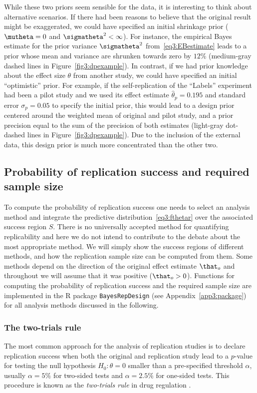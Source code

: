 While these two priors seem sensible for the \citet{Protzko2020} data, it is
interesting to think about alternative scenarios. If there had been reasons to
believe that the original result might be exaggerated, we could have specified
an initial shrinkage prior ($\mutheta = 0$ and $\sigmatheta^{2} < \infty$). For
instance, the empirical Bayes estimate for the prior variance $\sigmatheta^{2}$
from~\eqref{eq3:EBestimate} leads to a prior whose mean and variance are shrunken
towards zero by $12$\% (medium-gray
dashed lines in Figure~\ref{fig3:dpexample}). In contrast, if we had prior
knowledge about the effect size $\theta$ from another study, we could have
specified an initial ``optimistic'' prior. For example, if the self-replication
of the ``Labels'' experiment had been a pilot study and we used its
effect estimate $\hat{\theta}_{p} = 0.195$ and
standard error $\sigma_{p} = 0.05$ to specify
the initial prior, this would lead to a design prior centered around the
weighted mean of original and pilot study, and a prior precision equal to the
sum of the precision of both estimates (light-gray dot-dashed lines in
Figure~\ref{fig3:dpexample}). Due to the inclusion of the external data, this
design prior is much more concentrated than the other two.


\subsection{Probability of replication success and required sample size}
To compute the probability of replication success one needs to select an
analysis method and integrate the predictive distribution~\eqref{eq3:fthetar}
over the associated success region $S$. There is no universally accepted method
for quantifying replicability and here we do not intend to contribute to the
debate about the most appropriate method. We will simply show the success
regions of different methods, and how the replication sample size can be
computed from them. Some methods depend on the direction of the original effect
estimate $\that_{o}$ and throughout we will assume that it was positive
($\that_{o} > 0$). Functions for computing the probability of replication
success and the required sample size are implemented in the R package
\texttt{BayesRepDesign} (see Appendix~\ref{app3:package}) for all analysis
methods discussed in the following.


\subsubsection{The two-trials rule}
The most common approach for the analysis of replication studies is to declare
replication success when both the original and replication study lead to a
$p$-value for testing the null hypothesis $H_{0} \colon \theta = 0$ smaller than
a pre-specified threshold $\alpha$, usually $\alpha = 5\%$ for two-sided tests
and $\alpha = 2.5\%$ for one-sided tests. This procedure is known as the
\emph{two-trials rule} in drug regulation \citep{Senn2008}.

